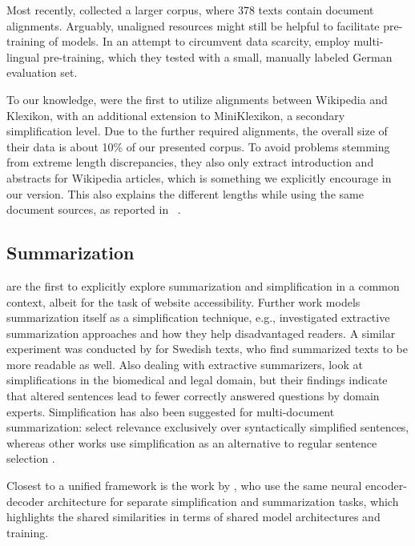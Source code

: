 \documentclass[10pt, a4paper]{article}
\begin{document}
Most recently, \cite{battisti-etal-2020-corpus} collected a larger corpus, where 378 texts contain document alignments. Arguably, unaligned resources might still be helpful to facilitate pre-training of models.
In an attempt to circumvent data scarcity, \cite{mallinson-etal-2020-zero} employ multi-lingual pre-training, which they tested with a small, manually labeled German evaluation set.

To our knowledge, \cite{hewett-stede-2021-automatically} were the first to utilize alignments between Wikipedia and Klexikon, with an additional extension to MiniKlexikon, a secondary simplification level. Due to the further required alignments, the overall size of their data is about 10\% of our presented corpus. To avoid problems stemming from extreme length discrepancies, they also only extract introduction and abstracts for Wikipedia articles, which is something we explicitly encourage in our version. This also explains the different lengths while using the same document sources, as reported in ~.




\subsection{Summarization}
\cite{parmanto2005access} are the first to explicitly explore summarization and simplification in a common context, albeit for the task of website accessibility.
Further work models summarization itself as a simplification technique, e.g., 
\cite{margarido2008automatic} investigated extractive summarization approaches and how they help disadvantaged readers. A similar experiment was conducted by \cite{smith-jonsson-2011-automatic} for Swedish texts, who find summarized texts to be more readable as well.
Also dealing with extractive summarizers, \cite{finegan2016sentence} look at simplifications in the biomedical and legal domain, but their findings indicate that altered sentences lead to fewer correctly answered questions by domain experts.
Simplification has also been suggested for multi-document summarization:
\cite{siddharthan-etal-2004-syntactic} select relevance exclusively over syntactically simplified sentences, whereas other works use simplification as an alternative to regular sentence selection \cite{vanderwende2006beyond,yih2007multi}.

Closest to a unified framework is the work by \cite{ma2017semantic}, who use the same neural encoder-decoder architecture for separate simplification and summarization tasks, which highlights the shared similarities in terms of shared model architectures and training.
\end{document}
